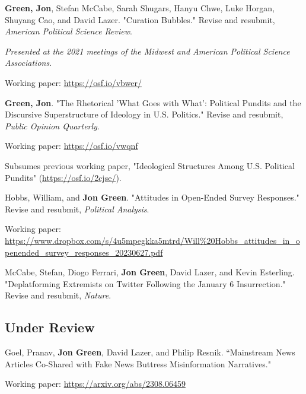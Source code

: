 \documentclass[letterpaper]{article}
\renewenvironment{itemize}{
  \begin{list}{}{
    \setlength{\leftmargin}{1.5em}
  }
}{
  \end{list}
}
\begin{document}
\begin{itemize}

\item \textbf{Green, Jon}, Stefan McCabe, Sarah Shugars, Hanyu Chwe, Luke Horgan, Shuyang Cao, and David Lazer. "Curation Bubbles." Revise and resubmit, \textit{American Political Science Review}.
\begin{itemize}
\item \textit{Presented at the 2021 meetings of the Midwest and American Political Science Associations}.
\item Working paper: \url{https://osf.io/vbwer/}
\end{itemize} 

\item \textbf{Green, Jon}. "The Rhetorical 'What Goes with What': Political Pundits and the Discursive Superstructure of Ideology in U.S. Politics." Revise and resubmit, \textit{Public Opinion Quarterly}.
\begin{itemize}
\item Working paper: \url{https://osf.io/vwqnf}
\item Subsumes previous working paper, "Ideological Structures Among U.S. Political Pundits" (\url{https://osf.io/2cjse/}).
\end{itemize}

\item Hobbs, William, and \textbf{Jon Green}. "Attitudes in Open-Ended Survey Responses." Revise and resubmit, \textit{Political Analysis}.
\begin{itemize}
\item Working paper: \url{https://www.dropbox.com/s/4u5mpegkka5mtrd/Will\%20Hobbs_attitudes_in_openended_survey_responses_20230627.pdf}
\end{itemize}

\item McCabe, Stefan, Diogo Ferrari, \textbf{Jon Green}, David Lazer, and Kevin Esterling. "Deplatforming Extremists on Twitter Following the January 6 Insurrection."  Revise and resubmit, \textit{Nature}.

\end{itemize}


\subsection*{Under Review}
\begin{itemize}

\item Goel, Pranav, \textbf{Jon Green}, David Lazer, and Philip Resnik. ``Mainstream News Articles Co-Shared with Fake News Buttress Misinformation Narratives."
\begin{itemize}
\item Working paper: \url{https://arxiv.org/abs/2308.06459}
\end{itemize}

\end{itemize}
\end{document}
